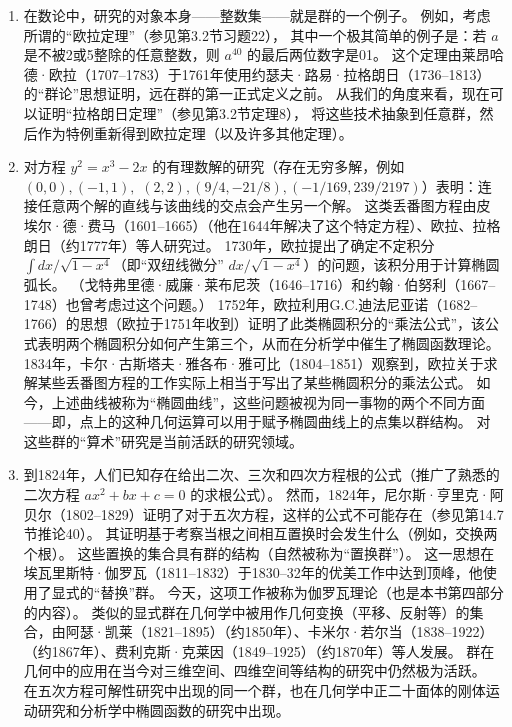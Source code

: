 \begin{enumerate}[label=(\arabic*)]
\item 在数论中，研究的对象本身——整数集——就是群的一个例子。
例如，考虑所谓的“欧拉定理”（参见第3.2节习题22），
其中一个极其简单的例子是：若 \(a\) 是不被2或5整除的任意整数，则 \(a^{40}\) 的最后两位数字是01。
这个定理由莱昂哈德·欧拉（1707–1783）于1761年使用约瑟夫·路易·拉格朗日（1736–1813）的“群论”思想证明，远在群的第一正式定义之前。
从我们的角度来看，现在可以证明“拉格朗日定理”（参见第3.2节定理8），
将这些技术抽象到任意群，然后作为特例重新得到欧拉定理（以及许多其他定理）。
\item 对方程 \(y^{2} = x^{3} - 2x\) 的有理数解的研究（存在无穷多解，例如 \((0,0), (-1,1), \)
\((2,2), (9/4, -21/8), (-1/169, 239/2197)\)）表明：连接任意两个解的直线与该曲线的交点会产生另一个解。
这类丢番图方程由皮埃尔·德·费马（1601–1665）（他在1644年解决了这个特定方程）、欧拉、拉格朗日（约1777年）等人研究过。
1730年，欧拉提出了确定不定积分 \(\int dx / \sqrt{1 - x^{4}}\)（即“双纽线微分” \(dx / \sqrt{1 - x^{4}}\)）的问题，该积分用于计算椭圆弧长。
（戈特弗里德·威廉·莱布尼茨（1646–1716）和约翰·伯努利（1667–1748）也曾考虑过这个问题。）
1752年，欧拉利用G.C.迪法尼亚诺（1682–1766）的思想（欧拉于1751年收到）证明了此类椭圆积分的“乘法公式”，该公式表明两个椭圆积分如何产生第三个，从而在分析学中催生了椭圆函数理论。
1834年，卡尔·古斯塔夫·雅各布·雅可比（1804–1851）观察到，欧拉关于求解某些丢番图方程的工作实际上相当于写出了某些椭圆积分的乘法公式。
如今，上述曲线被称为“椭圆曲线”，这些问题被视为同一事物的两个不同方面——即，点上的这种几何运算可以用于赋予椭圆曲线上的点集以群结构。
对这些群的“算术”研究是当前活跃的研究领域。
\item 到1824年，人们已知存在给出二次、三次和四次方程根的公式（推广了熟悉的二次方程 \(ax^{2}+bx+c=0\) 的求根公式）。
然而，1824年，尼尔斯·亨里克·阿贝尔（1802–1829）证明了对于五次方程，这样的公式不可能存在（参见第14.7节推论40）。
其证明基于考察当根之间相互置换时会发生什么（例如，交换两个根）。
这些置换的集合具有群的结构（自然被称为“置换群”）。
这一思想在埃瓦里斯特·伽罗瓦（1811–1832）于1830–32年的优美工作中达到顶峰，他使用了显式的“替换”群。
今天，这项工作被称为伽罗瓦理论（也是本书第四部分的内容）。
类似的显式群在几何学中被用作几何变换（平移、反射等）的集合，由阿瑟·凯莱（1821–1895）（约1850年）、卡米尔·若尔当（1838–1922）（约1867年）、费利克斯·克莱因（1849–1925）（约1870年）等人发展。
群在几何中的应用在当今对三维空间、四维空间等结构的研究中仍然极为活跃。
在五次方程可解性研究中出现的同一个群，也在几何学中正二十面体的刚体运动研究和分析学中椭圆函数的研究中出现。
\end{enumerate}

